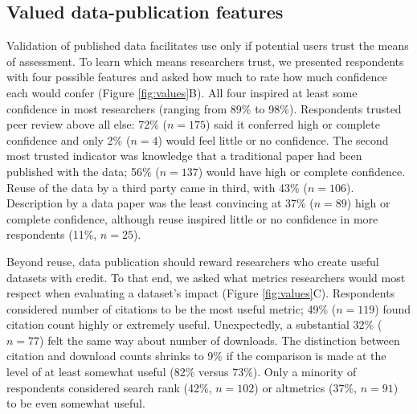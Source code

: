 \documentclass[10pt]{article}
\begin{document}
\subsection*{Valued data-publication features}

Validation of published data facilitates use only if potential users trust the means of assessment.
To learn which means researchers trust, we presented respondents with four possible features and asked how much to rate how much confidence each would confer (Figure \ref{fig:values}B).
All four inspired at least some confidence in most researchers (ranging from 89\% to 98\%).
Respondents trusted peer review above all else: 72\% ($n=175$) said it conferred high or complete confidence and only 2\% ($n=4$) would feel little or no confidence.
The second most trusted indicator was knowledge that a traditional paper had been published with the data; 56\% ($n=137$) would have high or complete confidence.
Reuse of the data by a third party came in third, with 43\% ($n=106$). 
Description by a data paper was the least convincing at 37\% ($n=89$) high or complete confidence, although reuse inspired little or no confidence in more respondents (11\%, $n=25$).

Beyond reuse, data publication should reward researchers who create useful datasets with credit.
To that end, we asked what metrics researchers would most respect when evaluating a dataset's impact (Figure \ref{fig:values}C).
Respondents considered number of citations to be the most useful metric; 49\% ($n=119$) found citation count highly or extremely useful. 
Unexpectedly, a substantial 32\% ($n=77$) felt the same way about number of downloads.
The distinction between citation and download counts shrinks to 9\% if the comparison is made at the level of at least somewhat useful (82\% versus 73\%).
Only a minority of respondents considered search rank (42\%, $n=102$) or altmetrics (37\%, $n=91$) to be even somewhat useful.
\end{document}
